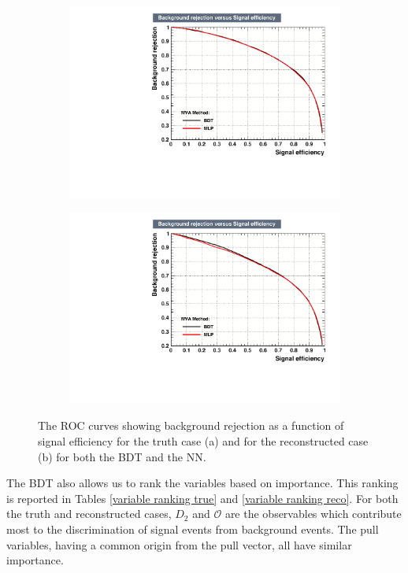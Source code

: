 \documentclass[10pt,a4paper]{book}
\begin{document}
\begin{figure}[h]
\begin{subfigure}{1.0\textwidth}
\centering
\includegraphics[scale=0.7]{ch4_images/ROC_truth}
\caption{}
\end{subfigure}
\begin{subfigure}{1.0\textwidth}
\centering
\includegraphics[scale=0.7]{ch4_images/ROC_reco}
\caption{}
\end{subfigure}
\caption{The ROC curves showing background rejection as a function of signal efficiency for the truth case (a) and for the reconstructed case (b) for both the BDT and the NN.}
\label{ROC curves}
\end{figure} 

The BDT also allows us to rank the variables based on importance. This ranking is reported in Tables \ref{variable ranking true} and \ref{variable ranking reco}. For both the truth and reconstructed cases, $D_2$ and $\mathcal{O}$ are the observables which contribute most to the discrimination of signal events from background events. The pull variables, having a common origin from the pull vector, all have similar importance.
\end{document}
